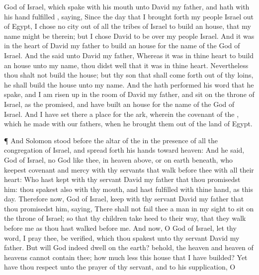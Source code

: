 {{}
God of
Israel, which
spake with his
mouth unto
David my
father, and hath with his
hand
fulfilled
{},
saying,
Since the
day that I brought
forth my
people
Israel out of
Egypt, I
chose no
city out of all the
tribes of
Israel to
build an
house, that my
name might be therein; but I
chose
David to be over my
people
Israel.
And it was in the
heart of
David my
father to
build an
house for the
name of the
{}
God of
Israel.
And the
{}
said unto
David my
father,
Whereas it was in thine
heart to
build an
house unto my
name, thou didst
well that it was in thine
heart.
Nevertheless thou shalt not
build the
house; but thy
son that shall come forth
out of thy
loins, he shall
build the
house unto my
name.
And the
{} hath
performed his
word that he
spake, and I am risen
up in the room of
David my
father, and
sit on the
throne of
Israel, as the
{}
promised, and have
built an
house for the
name of the
{}
God of
Israel.
And I have
set there a
place for the
ark, wherein
{} the
covenant of the
{}, which he
made with our
fathers, when he brought them
out of the
land of
Egypt.
\par }{\PP {}¶ And
Solomon
stood
before the
altar of the
{} in the presence
of all the
congregation of
Israel, and spread
forth his
hands toward
heaven:
And he
said,
{}
God of
Israel,
{} no
God like thee, in
heaven
above, or on
earth beneath, who
keepest
covenant and
mercy with thy
servants that
walk
before thee with all their
heart:
Who hast
kept with thy
servant
David my
father that thou
promisedst him: thou
spakest also with thy
mouth, and hast
fulfilled
{} with thine
hand, as
{} this
day.
Therefore now,
{}
God of
Israel,
keep with thy
servant
David my
father that thou
promisedst him,
saying, There shall not
fail thee a
man in my
sight to
sit on the
throne of
Israel;
so that thy
children take
heed to their
way, that they
walk
before me as thou hast
walked
before me.
And now, O
God of
Israel, let thy
word, I pray thee, be
verified, which thou
spakest unto thy
servant
David my
father.
But will
God
indeed
dwell on the
earth? behold, the
heaven and
heaven of
heavens cannot
contain thee; how much
less this
house that I have
builded?
Yet have thou
respect unto the
prayer of thy
servant, and to his
supplication, O
{\ND{
}}}
